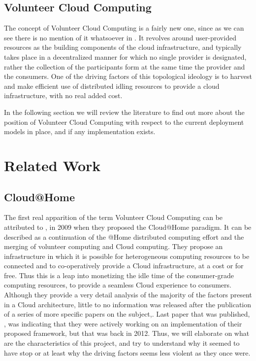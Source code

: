 \documentclass[11pt]{amsart}
\begin{document}
	
	\subsection{Volunteer Cloud Computing}
	The concept of Volunteer Cloud Computing is a fairly new one, since as we can see there is no 
	mention of it whatsoever in \cite{nist}\cite{taxonomy}. It revolves around user-provided 
	resources as the building components of the cloud infrastructure, and typically takes place in 
	a decentralized manner for which no single provider is designated, rather the collection of the
	participants form at the same time the provider and the consumers. One of the driving factors of 
	this topological ideology is to harvest and make efficient use of distributed idling 
	resources to provide a cloud infrastructure, with no real added cost. 
	
	In the following section we will review the literature to find out more about the position of 
	Volunteer Cloud Computing with respect to the current deployment models in place, and if any 
	implementation exists.
	
	\section{Related Work}
	
	\subsection{Cloud@Home}
	The first real apparition of the term Volunteer Cloud Computing can be attributed to 
	\cite{cathome}, in 2009 when they proposed the Cloud@Home paradigm. It can be described as a 
	continuation of the @Home distributed computing effort and the merging of volunteer computing and 
	Cloud computing. They propose an infrastructure in which it is possible for heterogeneous 
	computing resources to be connected and to co-operatively provide a Cloud infrastructure, at a 
	cost or for free. Thus this is a leap into monetizing the idle time of the consumer-grade 
	computing resources, to provide a seamless Cloud experience to consumers. Although they provide a 
	very detail analysis of the majority of the factors present in a Cloud architecture, little to no 
	information was released after the publication of a series of more specific papers on the 
	subject,.
	Last paper that was published, \cite{cathome11}, was indicating that they were actively working on 
	an implementation of their proposed framework, but that was back in 2012. Thus, we will elaborate 
	on what are the characteristics of this project, and try to understand why it seemed to have stop 
	or at least why the driving factors seems less violent as they once were.
	
\end{document}
